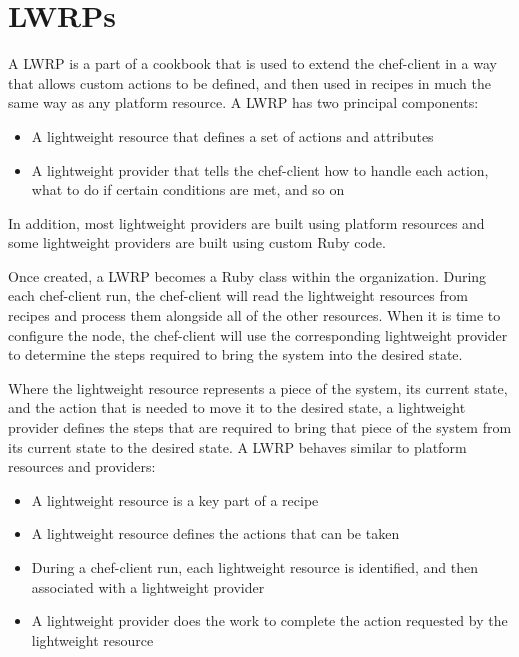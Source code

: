 \section{LWRPs}

A LWRP is a part of a cookbook that is used to extend the chef-client in a way that allows custom actions to be defined, and then used in recipes in much the same way as any platform resource. A LWRP has two principal components:

\begin{itemize}
  \item A lightweight resource that defines a set of actions and attributes
  \item A lightweight provider that tells the chef-client how to handle each action, what to do if certain conditions are met, and so on
\end{itemize}

In addition, most lightweight providers are built using platform resources and some lightweight providers are built using custom Ruby code.

Once created, a LWRP becomes a Ruby class within the organization. During each chef-client run, the chef-client will read the lightweight resources from recipes and process them alongside all of the other resources. When it is time to configure the node, the chef-client will use the corresponding lightweight provider to determine the steps required to bring the system into the desired state.

Where the lightweight resource represents a piece of the system, its current state, and the action that is needed to move it to the desired state, a lightweight provider defines the steps that are required to bring that piece of the system from its current state to the desired state. A LWRP behaves similar to platform resources and providers:

\begin{itemize}
  \item A lightweight resource is a key part of a recipe
  \item A lightweight resource defines the actions that can be taken
  \item During a chef-client run, each lightweight resource is identified, and then associated with a lightweight provider
  \item A lightweight provider does the work to complete the action requested by the lightweight resource
\end{itemize}

